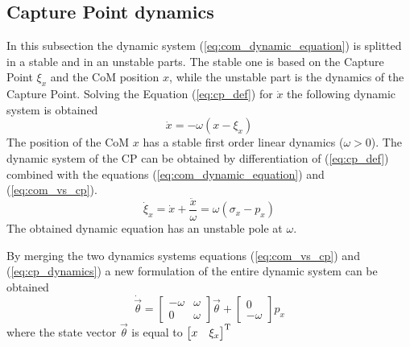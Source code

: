 \subsection{Capture Point dynamics}
In this subsection the dynamic system (\ref{eq:com_dynamic_equation}) is splitted in a stable and
in an unstable parts. The stable one is based on the Capture Point $\xi_x$ and the CoM position $x$, while the unstable part is the dynamics of the Capture Point.
Solving the Equation
(\ref{eq:cp_def}) for $\dot{x}$ the following dynamic system is obtained
\begin{equation}
  \label{eq:com_vs_cp}
  \dot{x} = - \omega (x - \xi_x)
\end{equation}
The position of the CoM $x$ has a stable first order linear dynamics ($\omega > 0$).
The dynamic system of the CP can be obtained by differentiation of (\ref{eq:cp_def}) combined with
the equations (\ref{eq:com_dynamic_equation}) and (\ref{eq:com_vs_cp}).
\begin{equation}
  \label{eq:cp_dynamics}
  \dot{\xi}_x = \dot{x} + \frac{\ddot{x}}{\omega} = \omega (\sigma_x - p_x) 
\end{equation}
The obtained dynamic equation has an unstable pole at $\omega$.
\par
By merging the two dynamics systems equations (\ref{eq:com_vs_cp}) and (\ref{eq:cp_dynamics}) a new
formulation of the entire dynamic system can be obtained
\[
\dot{\vec{\theta}} =
\begin{bmatrix}
  -\omega & \omega \\
  0 & \omega
\end{bmatrix}
\vec{\theta} +
\begin{bmatrix}
  0 \\
  -\omega 
\end{bmatrix}
p_x
\]
where the state vector $\vec{\theta}$  is equal to $ \begin{bmatrix} x &  \xi_x \end{bmatrix}^{\mathrm{T}}$
